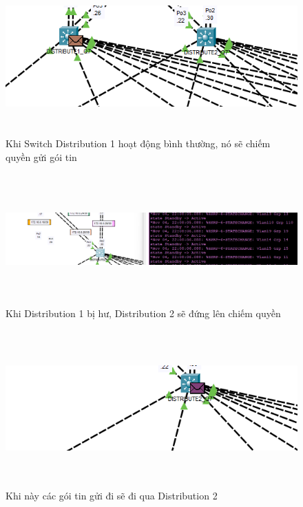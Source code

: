 \documentclass[a4paper, 12pt]{article}
\begin{document}
\begin{figure}[H]
    \centering
    \includegraphics[width=16cm, height=6cm]{img/4.13.2b.png}
    \caption{Khi Switch Distribution 1 hoạt động bình thường, nó sẽ chiếm quyền gửi gói tin }
    \label{hinh4132b}
\end{figure}

\begin{figure}[H]
    \centering
    \includegraphics[width=16cm, height=5cm]{img/4.13.2c.png}
    \caption{Khi Distribution 1 bị hư, Distribution 2 sẽ đứng lên chiếm quyền }
    \label{hinh4132c}
\end{figure}

\begin{figure}[H]
    \centering
    \includegraphics[width=16cm, height=6cm]{img/4.13.2d.png}
    \caption{Khi này các gói tin gửi đi sẽ đi qua Distribution 2}
    \label{hinh4132d}
\end{figure}
\end{document}
